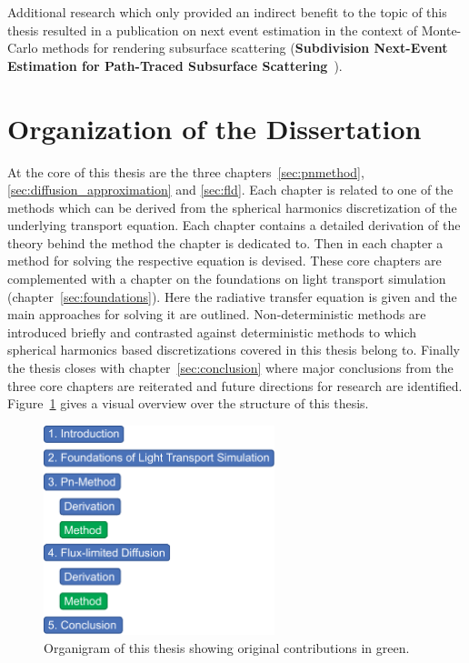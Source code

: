 Additional research which only provided an indirect benefit to the topic of this thesis resulted in a publication on next event estimation in the context of Monte-Carlo methods for rendering subsurface scattering (\textbf{Subdivision Next-Event Estimation for Path-Traced Subsurface Scattering}~\cite{Koerner16}).

\section{Organization of the Dissertation}

At the core of this thesis are the three chapters~\ref{sec:pnmethod}, \ref{sec:diffusion_approximation} and \ref{sec:fld}. Each chapter is related to one of the methods which can be derived from the spherical harmonics discretization of the underlying transport equation. Each chapter contains a detailed derivation of the theory behind the method the chapter is dedicated to. Then in each chapter a method for solving the respective equation is devised. These core chapters are complemented with a chapter on the foundations on light transport simulation (chapter~\ref{sec:foundations}). Here the radiative transfer equation is given and the main approaches for solving it are outlined. Non-deterministic methods are introduced briefly and contrasted against deterministic methods to which spherical harmonics based discretizations covered in this thesis belong to. Finally the thesis closes with chapter~\ref{sec:conclusion} where major conclusions from the three core chapters are reiterated and future directions for research are identified. Figure~\ref{fig:intro_organization} gives a visual overview over the structure of this thesis.
\begin{figure}[ht]
\hspace{0.1\columnwidth}
\includegraphics[width=0.6\textwidth]{02_Introduction/figures/fig_organigram.pdf}
\caption{Organigram of this thesis showing original contributions in green.}
\label{fig:intro_organization}
\end{figure}








